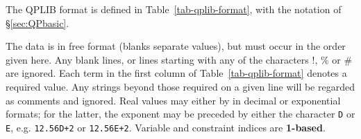 
The QPLIB format is defined in Table~\ref{tab-qplib-format}, with the notation of \S\ref{sec:QPbasic}.

The data is in free format (blanks separate values), but must occur in
the order given here. Any blank lines, or lines starting with any of the
characters !, \% or \# are ignored. Each term in the first column of
Table~\ref{tab-qplib-format} denotes a required value. Any strings beyond
those required on a given line will be regarded as comments and ignored.
Real values may either by in decimal or exponential formats; for the latter,
the exponent may be preceded by either the character \texttt{D} or \texttt{E},
e.g. \texttt{12.56D+2} or \texttt{12.56E+2}. Variable and constraint indices
are \textbf{1-based}.

